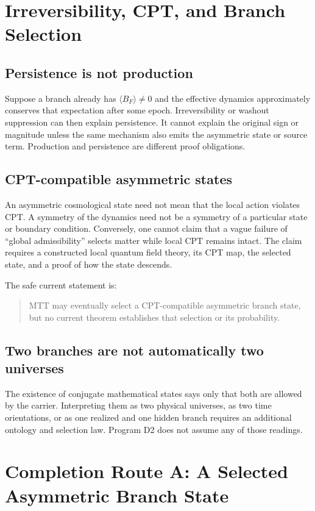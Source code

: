 \documentclass[11pt]{article}
\theoremstyle{definition}
\theoremstyle{remark}
\begin{document}
\section{Irreversibility, CPT, and Branch Selection}

\subsection{Persistence is not production}

Suppose a branch already has $\langle B_F\rangle\neq0$ and the effective
dynamics approximately conserves that expectation after some epoch.
Irreversibility or washout suppression can then explain persistence.  It
cannot explain the original sign or magnitude unless the same mechanism also
emits the asymmetric state or source term.  Production and persistence are
different proof obligations.

\subsection{CPT-compatible asymmetric states}

An asymmetric cosmological state need not mean that the local action violates
CPT.  A symmetry of the dynamics need not be a symmetry of a particular
state or boundary condition.  Conversely, one cannot claim that a vague
failure of ``global admissibility'' selects matter while local CPT remains
intact.  The claim requires a constructed local quantum field theory, its CPT
map, the selected state, and a proof of how the state descends.

The safe current statement is:
\begin{quote}
MTT may eventually select a CPT-compatible asymmetric branch state, but no
current theorem establishes that selection or its probability.
\end{quote}

\subsection{Two branches are not automatically two universes}

The existence of conjugate mathematical states says only that both are
allowed by the carrier.  Interpreting them as two physical universes, as two
time orientations, or as one realized and one hidden branch requires an
additional ontology and selection law.  Program D2 does not assume any of
those readings.

\section{Completion Route A: A Selected Asymmetric Branch State}
\end{document}
